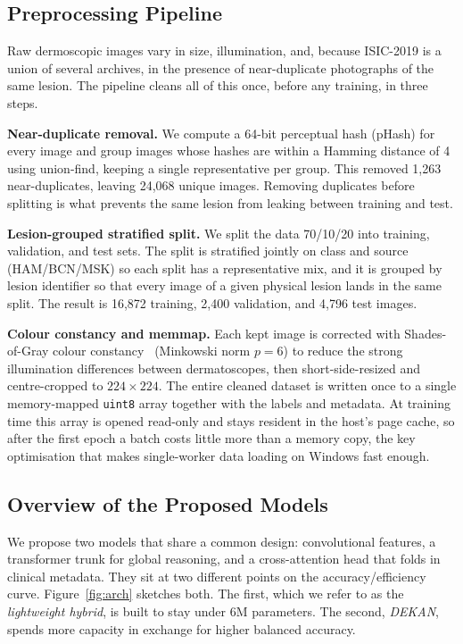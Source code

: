 \subsection{Preprocessing Pipeline}

Raw dermoscopic images vary in size, illumination, and, because ISIC-2019 is
a union of several archives, in the presence of near-duplicate photographs of
the same lesion. The pipeline cleans all of this once, before any training, in
three steps.

\textbf{Near-duplicate removal.} We compute a 64-bit perceptual hash (pHash) for
every image and group images whose hashes are within a Hamming distance of 4
using union-find, keeping a single representative per group. This removed
1{,}263 near-duplicates, leaving 24{,}068 unique images. Removing duplicates
before splitting is what prevents the same lesion from leaking between training
and test.

\textbf{Lesion-grouped stratified split.} We split the data 70/10/20 into
training, validation, and test sets. The split is stratified jointly on class
and source (HAM/BCN/MSK) so each split has a representative mix, and it is
grouped by lesion identifier so that every image of a given physical lesion lands
in the same split. The result is 16{,}872 training, 2{,}400 validation, and
4{,}796 test images.

\textbf{Colour constancy and memmap.} Each kept image is corrected with
Shades-of-Gray colour constancy~\cite{finlayson2004shadesofgray} (Minkowski norm
$p=6$) to reduce the strong illumination differences between dermatoscopes,
then short-side-resized and centre-cropped to $224\times224$. The entire cleaned
dataset is written once to a single memory-mapped \texttt{uint8} array together
with the labels and metadata. At training time this array is opened read-only and
stays resident in the host's page cache, so after the first epoch a batch costs
little more than a memory copy, the key optimisation that makes single-worker
data loading on Windows fast enough.

\subsection{Overview of the Proposed Models}

We propose two models that share a common design: convolutional features, a
transformer trunk for global reasoning, and a cross-attention head that folds in
clinical metadata. They sit at two different points on the
accuracy/efficiency curve. Figure~\ref{fig:arch} sketches both. The first,
which we refer to as the \emph{lightweight hybrid}, is built to stay under 6M
parameters. The second, \emph{DEKAN}, spends more capacity in exchange for higher
balanced accuracy.

